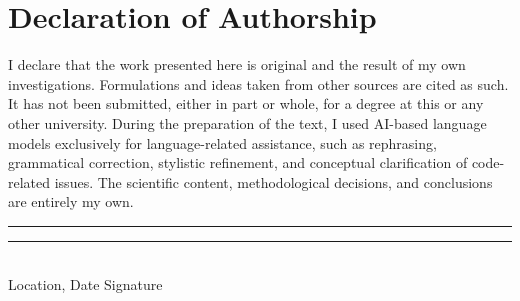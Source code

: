 \chapter{Declaration of Authorship}
\thispagestyle{empty}

\noindent%
I declare that the work presented here is original and the result of my own investigations.
Formulations and ideas taken from other sources are cited as such.
It has not been submitted, either in part or whole, for a degree at this or any other university.
During the preparation of the text, I used AI-based language models exclusively for language-related assistance, 
such as rephrasing, grammatical correction, stylistic refinement, and 
conceptual clarification of code-related issues.
The scientific content, methodological decisions, and conclusions are entirely my own.


\vfill
\noindent%
\rule[1em]{8em}{0.5pt}  \hfill \rule[1em]{8em}{0.5pt}\\ %
Location, Date \hfill Signature\\
\cleardoublepage
